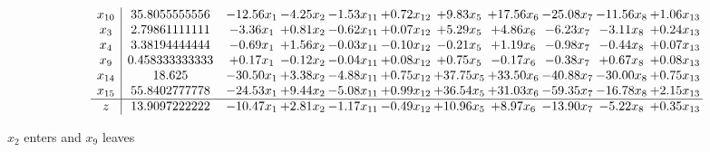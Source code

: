 \documentclass[9pt]{article}
\begin{document}
 \[\begin{array}{c| c c@{\hskip 2pt} c@{\hskip 2pt} c@{\hskip 2pt} c@{\hskip 2pt} c@{\hskip 2pt} c@{\hskip 2pt} c@{\hskip 2pt} c@{\hskip 2pt} c@{\hskip 2pt} }
 x_{10}   &  35.8055555556 & -12.56 x_{1} & -4.25 x_{2} & -1.53 x_{11} & +  0.72 x_{12} & +  9.83 x_{5} & + 17.56 x_{6} & -25.08 x_{7} & -11.56 x_{8} & +  1.06 x_{13}\\
 x_{3}   &  2.79861111111 & -3.36 x_{1} & +  0.81 x_{2} & -0.62 x_{11} & +  0.07 x_{12} & +  5.29 x_{5} & +  4.86 x_{6} & -6.23 x_{7} & -3.11 x_{8} & +  0.24 x_{13}\\
 x_{4}   &  3.38194444444 & -0.69 x_{1} & +  1.56 x_{2} & -0.03 x_{11} & -0.10 x_{12} & -0.21 x_{5} & +  1.19 x_{6} & -0.98 x_{7} & -0.44 x_{8} & +  0.07 x_{13}\\
 x_{9}   &  0.458333333333 & +  0.17 x_{1} & -0.12 x_{2} & -0.04 x_{11} & +  0.08 x_{12} & +  0.75 x_{5} & -0.17 x_{6} & -0.38 x_{7} & +  0.67 x_{8} & +  0.08 x_{13}\\
 x_{14}   &  18.625 & -30.50 x_{1} & +  3.38 x_{2} & -4.88 x_{11} & +  0.75 x_{12} & + 37.75 x_{5} & + 33.50 x_{6} & -40.88 x_{7} & -30.00 x_{8} & +  0.75 x_{13}\\
 x_{15}   &  55.8402777778 & -24.53 x_{1} & +  9.44 x_{2} & -5.08 x_{11} & +  0.99 x_{12} & + 36.54 x_{5} & + 31.03 x_{6} & -59.35 x_{7} & -16.78 x_{8} & +  2.15 x_{13}\\
\hline
z    &  13.9097222222 & -10.47 x_{1} & +  2.81 x_{2} & -1.17 x_{11} & -0.49 x_{12} & + 10.96 x_{5} & +  8.97 x_{6} & -13.90 x_{7} & -5.22 x_{8} & +  0.35 x_{13}\\
\end{array}\]


 $ x_{2} $ enters and $ x_{9} $ leaves 
\end{document}

